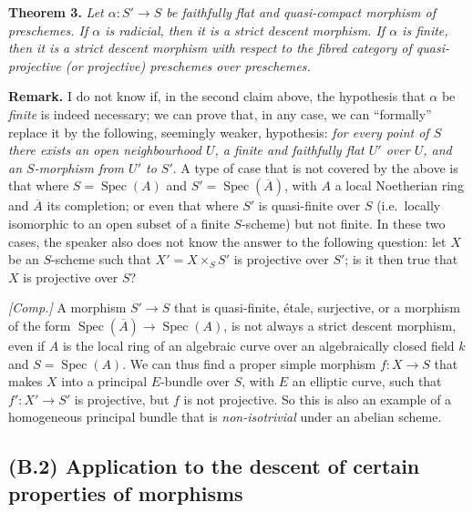\documentclass{article}
\newenvironment{itenv}[1]
  {\phantomsection\par\smallskip\noindent\textbf{#1.}\itshape}
  {\par\smallskip}
\newenvironment{rmenv}[1]
  {\phantomsection\par\smallskip\noindent\textbf{#1.}\rmfamily}
  {\par\smallskip}
\theoremstyle{definition}
\theoremstyle{definition}
\theoremstyle{definition}
\theoremstyle{definition}
\theoremstyle{remark}
\begin{document}
\leavevmode{}%
\begin{itenv}{Theorem 3}
Let \(\alpha\colon S'\to S\) be faithfully flat and quasi-compact morphism of preschemes.
If \(\alpha\) is \emph{radicial}, then it is a \emph{strict descent morphism}.
If \(\alpha\) is finite, then it is a strict descent morphism with respect to the fibred category of quasi-projective (or projective) preschemes over preschemes.

\end{itenv}

\begin{rmenv}{Remark}
I do not know if, in the second claim above, the hypothesis that \(\alpha\) be \emph{finite} is indeed necessary;
we can prove that, in any case, we can ``formally'' replace it by the following, seemingly weaker, hypothesis:
\emph{for every point of \(S\) there exists an open neighbourhood \(U\), a finite and faithfully flat \(U'\) over \(U\), and an \(S\)-morphism from \(U'\) to \(S'\)}.
A type of case that is not covered by the above is that where \(S=\operatorname{Spec}(A)\) and \(S'=\operatorname{Spec}(\overline{A})\), with \(A\) a local Noetherian ring and \(\overline{A}\) its completion;
or even that where \(S'\) is quasi-finite over \(S\) (i.e.~locally isomorphic to an open subset of a finite \(S\)-scheme) but not finite.
In these two cases, the speaker also does not know the answer to the following question:
let \(X\) be an \(S\)-scheme such that \(X'=X\times_S S'\) is projective over \(S'\);
is it then true that \(X\) is projective over \(S\)?

\emph{{[}Comp.{]}}
A morphism \(S'\to S\) that is quasi-finite, étale, surjective, or a morphism of the form \(\operatorname{Spec}(\overline{A})\to\operatorname{Spec}(A)\), is not always a strict descent morphism, even if \(A\) is the local ring of an algebraic curve over an algebraically closed field \(k\) and \(S=\operatorname{Spec}(A)\).
We can thus find a proper simple morphism \(f\colon X\to S\) that makes \(X\) into a principal \(E\)-bundle over \(S\), with \(E\) an elliptic curve, such that \(f'\colon X'\to S'\) is projective, but \(f\) is not projective.
So this is also an example of a homogeneous principal bundle that is \emph{non-isotrivial} under an abelian scheme.

\end{rmenv}

\hypertarget{fga-3-i-section-B.2}{%
\subsection{(B.2) Application to the descent of certain properties of morphisms}\label{fga-3-i-section-B.2}}
\end{document}

